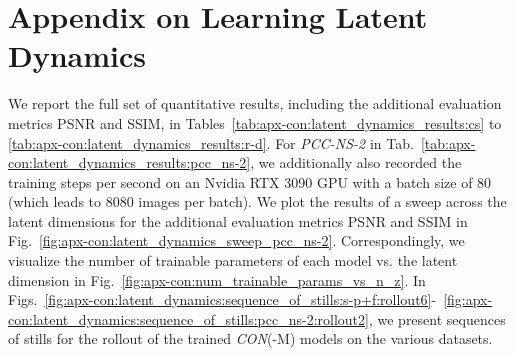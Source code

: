\section{Appendix on Learning Latent Dynamics}\label{sec:apx-con:latent_dynamics_results}
We report the full set of quantitative results, including the additional evaluation metrics \gls{PSNR} and \gls{SSIM}, in Tables~\ref{tab:apx-con:latent_dynamics_results:cs} to \ref{tab:apx-con:latent_dynamics_results:r-d}. For \emph{PCC-NS-2} in Tab.~\ref{tab:apx-con:latent_dynamics_results:pcc_ns-2}, we additionally also recorded the training steps per second on an Nvidia RTX 3090 GPU with a batch size of $80$ (which leads to $8080$ images per batch).
We plot the results of a sweep across the latent dimensions for the additional evaluation metrics \gls{PSNR} and \gls{SSIM} in Fig.~\ref{fig:apx-con:latent_dynamics_sweep_pcc_ns-2}. Correspondingly, we visualize the number of trainable parameters of each model vs. the latent dimension in Fig.~\ref{fig:apx-con:num_trainable_params_vs_n_z}.
In Figs.~\ref{fig:apx-con:latent_dynamics:sequence_of_stills:s-p+f:rollout6}-~\ref{fig:apx-con:latent_dynamics:sequence_of_stills:pcc_ns-2:rollout2}, we present sequences of stills for the rollout of the trained \emph{CON}(-M) models on the various datasets. 

